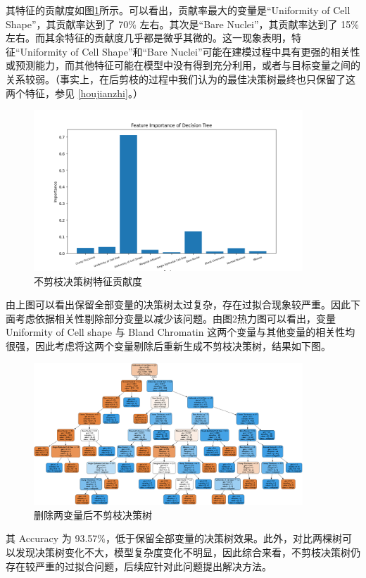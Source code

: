 \documentclass[a4paper,12pt,onecolumn,oneside]{article}
\begin{document}
	其特征的贡献度如图\ref{fig:oringinimportance}所示。可以看出，贡献率最大的变量是“Uniformity of Cell Shape”，其贡献率达到了 70\% 左右。其次是“Bare Nuclei”，其贡献率达到了 15\% 左右。而其余特征的贡献度几乎都是微乎其微的。这一现象表明，特征“Uniformity of Cell Shape”和“Bare Nuclei”可能在建模过程中具有更强的相关性或预测能力，而其他特征可能在模型中没有得到充分利用，或者与目标变量之间的关系较弱。（事实上，在后剪枝的过程中我们认为的最佳决策树最终也只保留了这两个特征，参见 \ref{houjianzhi}。）
	\begin{figure}[H]
		\centering
		\includegraphics[width=0.9\textwidth]{res3/origin_importance.png}
		\caption{不剪枝决策树特征贡献度}
		\label{fig:oringinimportance}
	\end{figure}
	
	
	由上图可以看出保留全部变量的决策树太过复杂，存在过拟合现象较严重。因此下面考虑依据相关性剔除部分变量以减少该问题。由图2热力图可以看出，变量 Uniformity of Cell shape 与 Bland Chromatin 这两个变量与其他变量的相关性均很强，因此考虑将这两个变量剔除后重新生成不剪枝决策树，结果如下图。
	\begin{figure}[H]
		\centering
		\includegraphics[width=0.9\textwidth]{res3/trees/tree_2.png}
		\caption{删除两变量后不剪枝决策树}
		\label{fig:treecor}
	\end{figure}
	其 Accuracy 为 93.57\%，低于保留全部变量的决策树效果。此外，对比两棵树可以发现决策树变化不大，模型复杂度变化不明显，因此综合来看，不剪枝决策树仍存在较严重的过拟合问题，后续应针对此问题提出解决方法。
\end{document}
